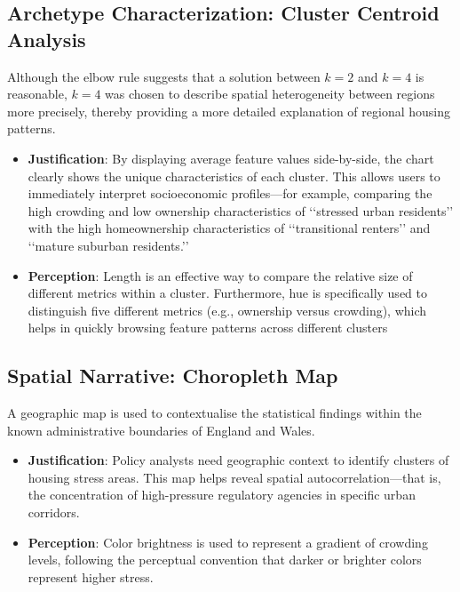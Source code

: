 \documentclass[conference]{IEEEtran}
\begin{document}
\subsection{Archetype Characterization: Cluster Centroid Analysis}
Although the elbow rule suggests that a solution between $k=2$ and $k=4$ is reasonable, $k=4$ was chosen to describe spatial heterogeneity between regions more precisely, thereby providing a more detailed explanation of regional housing patterns.
\begin{itemize}
    \item \textbf{Justification}: By displaying average feature values side-by-side, the chart clearly shows the unique characteristics of each cluster. This allows users to immediately interpret socioeconomic profiles—for example, comparing the high crowding and low ownership characteristics of ‘‘stressed urban residents’’ with the high homeownership characteristics of ‘‘transitional renters’’ and ‘‘mature suburban residents.’’
    \item \textbf{Perception}: Length is an effective way to compare the relative size of different metrics within a cluster. Furthermore, hue is specifically used to distinguish five different metrics (e.g., ownership versus crowding), which helps in quickly browsing feature patterns across different clusters
\end{itemize}

\subsection{Spatial Narrative: Choropleth Map}
A geographic map is used to contextualise the statistical findings within the known administrative boundaries of England and Wales.
\begin{itemize}
    \item \textbf{Justification}: Policy analysts need geographic context to identify clusters of housing stress areas. This map helps reveal spatial autocorrelation—that is, the concentration of high-pressure regulatory agencies in specific urban corridors.
    \item \textbf{Perception}: Color brightness is used to represent a gradient of crowding levels, following the perceptual convention that darker or brighter colors represent higher stress.
\end{itemize}
\end{document}
